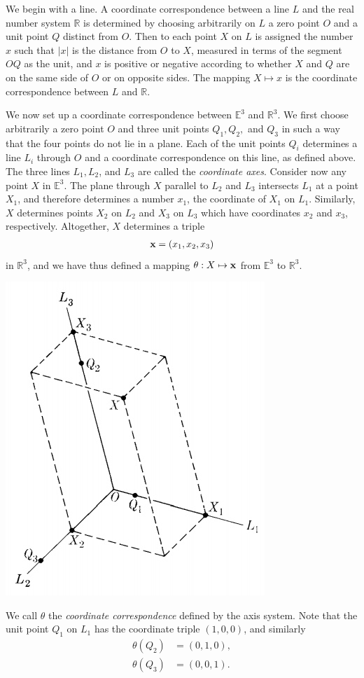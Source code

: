 \documentclass[12pt,letterpaper,reqno]{article}
\numberwithin{equation}{section}
\newcommand{\ti}[1]{\textit{#1}}
\begin{document}
We begin with a line. A coordinate correspondence between a line $L$ and the real number system $\mathbb{R}$ is determined by choosing arbitrarily on $L$ a zero point $O$ and a unit point $Q$ distinct from $O$. Then to each point $X$ on $L$ is assigned the number $x$ such that $|x|$ is the distance from $O$ to $X$, measured in terms of the segment $OQ$ as the unit, and $x$ is positive or negative according to whether $X$ and $Q$ are on the same side of $O$ or on opposite sides. The mapping $X \mapsto x$ is the coordinate correspondence between $L$ and $\mathbb{R}$. 

We now set up a coordinate correspondence between $\mathbb{E}^3$ and $\mathbb{R}^3$. We first choose arbitrarily a zero point $O$ and three unit points $Q_1, Q_2,$ and $Q_3$ in such a way that the four points do not lie in a plane. Each of the unit points $Q_i$ determines a line $L_i$ through $O$ and a coordinate correspondence on this line, as defined above. The three lines $L_1, L_2$, and $L_3$ are called the \ti{coordinate axes}. Consider now any point $X$ in $\mathbb{E}^3$. The plane through $X$ parallel to $L_2$ and $L_3$ intersects $L_1$ at a point $X_1$, and therefore determines a number $x_1$, the coordinate of $X_1$ on $L_1$. Similarly, $X$ determines points $X_2$ on $L_2$ and $X_3$ on $L_3$ which have coordinates $x_2$ and $x_3$, respectively. Altogether, $X$ determines a triple
\begin{align*}
	{\bf x}=(x_1,x_2,x_3)
\end{align*} 
in $\mathbb{R}^3$, and we have thus defined a mapping $\theta:X \mapsto {\bf x}$ from $\mathbb{E}^3$ to $\mathbb{R}^3$. 

\begin{center}
	\includegraphics[scale=0.5]{figures_mvc/e3_r3}
\end{center}
We call $\theta$ the \ti{coordinate correspondence} defined by the axis system. Note that the unit point $Q_1$ on $L_1$ has the coordinate triple $(1,0,0)$, and similarly
\begin{align*}
	\theta(Q_2)&=(0,1,0), \\
	\theta(Q_3)&=(0,0,1).
\end{align*}
\end{document}
